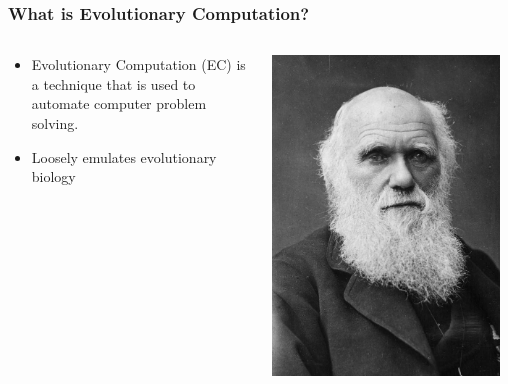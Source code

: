 \documentclass{beamer}
\begin{document}
\begin{frame}
  \frametitle{What is Evolutionary Computation?}
  \begin{columns}
  \begin{column}{0.6\textwidth}
  \begin{itemize}
  	\item Evolutionary Computation (EC) is a technique that is used to automate computer problem solving.
  	\item Loosely emulates evolutionary biology
  \end{itemize}
  \end{column}
  \begin{column}{0.4\textwidth}
   \includegraphics[width=0.95\textwidth]{Illustrations/darwin.jpg}
       \\
  \end{column}
  \end{columns}
\end{frame}
\end{document}
